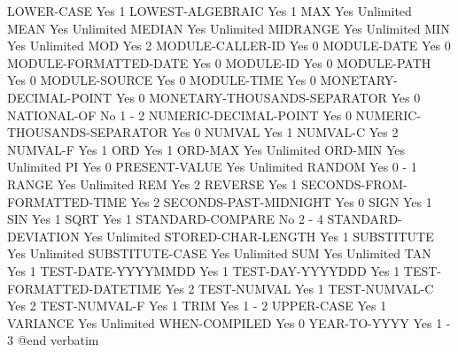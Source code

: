 LOWER-CASE                      Yes             1
LOWEST-ALGEBRAIC                Yes             1
MAX                             Yes             Unlimited
MEAN                            Yes             Unlimited
MEDIAN                          Yes             Unlimited
MIDRANGE                        Yes             Unlimited
MIN                             Yes             Unlimited
MOD                             Yes             2
MODULE-CALLER-ID                Yes             0
MODULE-DATE                     Yes             0
MODULE-FORMATTED-DATE           Yes             0
MODULE-ID                       Yes             0
MODULE-PATH                     Yes             0
MODULE-SOURCE                   Yes             0
MODULE-TIME                     Yes             0
MONETARY-DECIMAL-POINT          Yes             0
MONETARY-THOUSANDS-SEPARATOR    Yes             0
NATIONAL-OF                     No              1 - 2
NUMERIC-DECIMAL-POINT           Yes             0
NUMERIC-THOUSANDS-SEPARATOR     Yes             0
NUMVAL                          Yes             1
NUMVAL-C                        Yes             2
NUMVAL-F                        Yes             1
ORD                             Yes             1
ORD-MAX                         Yes             Unlimited
ORD-MIN                         Yes             Unlimited
PI                              Yes             0
PRESENT-VALUE                   Yes             Unlimited
RANDOM                          Yes             0 - 1
RANGE                           Yes             Unlimited
REM                             Yes             2
REVERSE                         Yes             1
SECONDS-FROM-FORMATTED-TIME     Yes             2
SECONDS-PAST-MIDNIGHT           Yes             0
SIGN                            Yes             1
SIN                             Yes             1
SQRT                            Yes             1
STANDARD-COMPARE                No              2 - 4
STANDARD-DEVIATION              Yes             Unlimited
STORED-CHAR-LENGTH              Yes             1
SUBSTITUTE                      Yes             Unlimited
SUBSTITUTE-CASE                 Yes             Unlimited
SUM                             Yes             Unlimited
TAN                             Yes             1
TEST-DATE-YYYYMMDD              Yes             1
TEST-DAY-YYYYDDD                Yes             1
TEST-FORMATTED-DATETIME         Yes             2
TEST-NUMVAL                     Yes             1
TEST-NUMVAL-C                   Yes             2
TEST-NUMVAL-F                   Yes             1
TRIM                            Yes             1 - 2
UPPER-CASE                      Yes             1
VARIANCE                        Yes             Unlimited
WHEN-COMPILED                   Yes             0
YEAR-TO-YYYY                    Yes             1 - 3
@end verbatim
